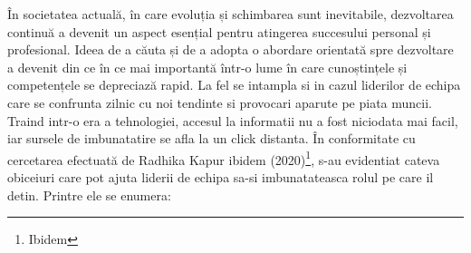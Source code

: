\documentclass[a4paper, 12pt]{article}
\begin{document}
\newpage
	\space\quad\quad În societatea actuală, în care evoluția și schimbarea sunt inevitabile, dezvoltarea continuă a devenit un aspect esențial pentru atingerea succesului personal și profesional. Ideea de a căuta și de a adopta o abordare orientată spre dezvoltare a devenit din ce în ce mai importantă într-o lume în care cunoștințele și competențele se depreciază rapid. La fel se intampla si in cazul liderilor de echipa care se confrunta zilnic cu noi tendinte si provocari aparute pe piata muncii. Traind intr-o era a tehnologiei, accesul la informatii nu a fost niciodata mai facil, iar sursele de imbunatatire se afla la un click distanta. În conformitate cu cercetarea efectuată de Radhika Kapur ibidem (2020)\footnote{Ibidem}, s-au evidentiat cateva obiceiuri care pot ajuta liderii de echipa sa-si imbunatateasca rolul pe care il detin. Printre ele se enumera: 
\end{document}

